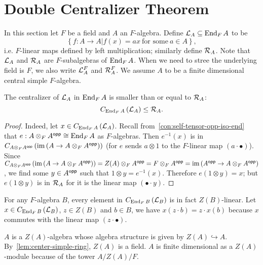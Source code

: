 \section{Double Centralizer Theorem}\label{sec:double-centralizer}

In this section let $F$ be a field and $A$ an $F$-algebra. Define
$\mathcal{L}_{A} \subseteq \operatorname{End}_{F}A$ to be
\[\left\{f : A \to A|f(x)=ax~\text{for some}~a\in A\right\},\]
i.e. $F$-linear maps defined by left multiplication; similarly define
$\mathcal{R}_{A}$. Note that $\mathcal{L}_{A}$ and $\mathcal{R}_A$ are $F$-subalgebras of
$\operatorname{End}_{F}A$. When we need to stree the underlying field is $F$, we also write
$\mathcal{L}_{A}^{F}$ and $\mathcal{R}_{A}^{F}$. We assume $A$ to be a finite dimensional
central simple $F$-algebra.
\begin{lemma}
  \label{lem:centralizer-mul-left-le}
  The centralizer of $\mathcal{L}_{A}$ in $\operatorname{End}_{F}A$ is smaller than or equal to
  $\mathcal{R}_{A}$:
  \[
    C_{\operatorname{End}_{F}A}\left(\mathcal{L}_{A}\right) \le \mathcal{R}_{A}.
  \]
  \leanok
\end{lemma}

\begin{proof}
  Indeed, let $x \in C_{\operatorname{End}_{F}A}\left(\mathcal{L}_{A}\right)$. Recall
  from~\cref{con:self-tensor-opp-iso-end} that
  $e : A\otimes_{F}A^{\mathsf{opp}}\cong \operatorname{End}_{F}A$ as $F$-algebras. Then $e^{-1}(x)$ is
  in
  $C_{A\otimes_{F}A^{\mathsf{opp}}}\left(\operatorname{im}\left(A\to A\otimes_{F}A^{\mathsf{opp}}\right)\right)$
  (for $e$ sends $a\otimes 1$ to the $F$-linear map $(a\cdot\bullet)$). Since
  $C_{A\otimes_{F}A^{\mathsf{opp}}}\left(\operatorname{im}\left(A\to A\otimes_{F}A^{\mathsf{opp}}\right)\right) = Z(A)\otimes_{F}A^{\mathsf{opp}}=F\otimes_{F}A^{\mathsf{opp}}=\operatorname{im}\left(A^{\mathsf{opp}}\to A\otimes_{F}A^{\mathsf{opp}}\right)$,
  we find some $y\in A^{\mathsf{opp}}$ such that $1 \otimes y = e^{-1}(x)$. Therefore
  $e\left(1\otimes y\right) = x$; but $e\left(1\otimes y\right)$ is in
  $\mathcal{R}_{A}$ for it is the linear map $(\bullet\cdot y)$.
\end{proof}

\begin{remark}\label{rem:mul-left-center-linear}
  For any $F$-algebra $B$, every element in $C_{\operatorname{End}_{F}B}\left(\mathcal{L}_{B}\right)$
  is in fact $Z(B)$-linear. Let $x\in C_{\operatorname{End}_{F}B}\left(\mathcal{L}_{B}\right)$,
  $z\in Z(B)$ and $b \in B$, we have $x(z\cdot b) = z\cdot x(b)$ because $x$
  commutes with the linear map $\left(z\cdot\bullet\right)$.
\end{remark}

\begin{remark}
  $A$ is a $Z(A)$-algebra whose algebra structure is given by
  $Z(A)\hookrightarrow A$. By~\cref{lem:center-simple-ring}, $Z(A)$ is a field.
  $A$ is finite dimensional as a $Z(A)$-module because of the tower $A/Z(A)/F$.
\end{remark}

